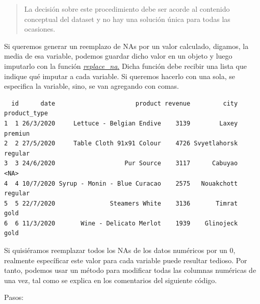 \documentclass[
  letterpaper,
  DIV=11,
  numbers=noendperiod]{scrreprt}
\newenvironment{Shaded}{\begin{snugshade}}{\end{snugshade}}
\newcommand{\AttributeTok}[1]{\textcolor[rgb]{0.40,0.45,0.13}{#1}}
\newcommand{\ConstantTok}[1]{\textcolor[rgb]{0.56,0.35,0.01}{#1}}
\newcommand{\DecValTok}[1]{\textcolor[rgb]{0.68,0.00,0.00}{#1}}
\newcommand{\FunctionTok}[1]{\textcolor[rgb]{0.28,0.35,0.67}{#1}}
\newcommand{\NormalTok}[1]{\textcolor[rgb]{0.00,0.23,0.31}{#1}}
\newcommand{\OtherTok}[1]{\textcolor[rgb]{0.00,0.23,0.31}{#1}}
\newcommand{\SpecialCharTok}[1]{\textcolor[rgb]{0.37,0.37,0.37}{#1}}
\begin{document}
\begin{quote}
La decisión sobre este procedimiento debe ser acorde al contenido
conceptual del dataset y no hay una solución única para todas las
ocasiones.
\end{quote}

Si queremos generar un reemplazo de NAs por un valor calculado, digamos,
la media de esa variable, podemos guardar dicho valor en un objeto y
luego imputarlo con la función
\href{https://www.rdocumentation.org/packages/tidyr/versions/0.8.3/topics/replace_na}{\emph{replace\_na}.}
Dicha función debe recibir una lista que indique qué imputar a cada
variable. Si queremos hacerlo con una sola, se especifica la variable,
sino, se van agregando con comas.

\begin{Shaded}
\end{Shaded}

\begin{verbatim}
  id      date                      product revenue         city product_type
1  1 26/3/2020     Lettuce - Belgian Endive    3139        Laxey      premiun
2  2 27/5/2020     Table Cloth 91x91 Colour    4726 Svyetlahorsk      regular
3  3 24/6/2020                   Pur Source    3117      Cabuyao         <NA>
4  4 10/7/2020 Syrup - Monin - Blue Curacao    2575   Nouakchott      regular
5  5 22/7/2020               Steamers White    3136       Timrat         gold
6  6 11/3/2020       Wine - Delicato Merlot    1939    Glinojeck         gold
\end{verbatim}

Si quisiéramos reemplazar todos los NAs de los datos numéricos por un 0,
realmente específicar este valor para cada variable puede resultar
tedioso. Por tanto, podemos usar un método para modificar todas las
columnas numéricas de una vez, tal como se explica en los comentarios
del siguiente código.

Pasos:
\end{document}
